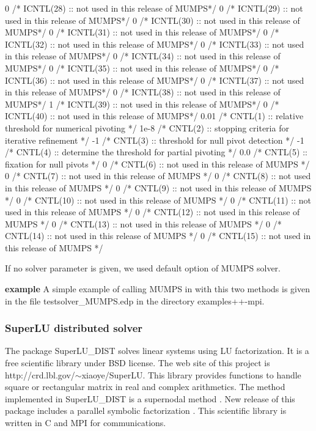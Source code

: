 \documentclass[a4paper,twoside,12pt]{book}
\begin{document}
 0         /* ICNTL(28) :: not used in this release of MUMPS*/
 0         /* ICNTL(29) :: not used in this release of MUMPS*/
 0         /* ICNTL(30) :: not used in this release of MUMPS*/
 0         /* ICNTL(31) :: not used in this release of MUMPS*/
 0         /* ICNTL(32) :: not used in this release of MUMPS*/
 0         /* ICNTL(33) :: not used in this release of MUMPS*/
 0         /* ICNTL(34) :: not used in this release of MUMPS*/
 0         /* ICNTL(35) :: not used in this release of MUMPS*/
 0         /* ICNTL(36) :: not used in this release of MUMPS*/
 0         /* ICNTL(37) :: not used in this release of MUMPS*/
 0         /* ICNTL(38) :: not used in this release of MUMPS*/
 1         /* ICNTL(39) :: not used in this release of MUMPS*/
 0         /* ICNTL(40) :: not used in this release of MUMPS*/
 0.01      /* CNTL(1) :: relative threshold for numerical pivoting */
 1e-8      /* CNTL(2) :: stopping criteria for iterative refinement */
 -1        /* CNTL(3) :: threshold for null pivot detection */
 -1        /* CNTL(4) :: determine the threshold for partial pivoting */
 0.0       /* CNTL(5) :: fixation for null pivots */
 0         /* CNTL(6) :: not used in this release of MUMPS */
 0         /* CNTL(7) :: not used in this release of MUMPS */
 0         /* CNTL(8) :: not used in this release of MUMPS */
 0         /* CNTL(9) :: not used in this release of MUMPS */
 0         /* CNTL(10) :: not used in this release of MUMPS */
 0         /* CNTL(11) :: not used in this release of MUMPS */
 0         /* CNTL(12) :: not used in this release of MUMPS */
 0         /* CNTL(13) :: not used in this release of MUMPS */
 0         /* CNTL(14) :: not used in this release of MUMPS */
 0         /* CNTL(15) :: not used in this release of MUMPS */	
\eFF

If no solver parameter is given, we used default option of MUMPS solver.

\begin{paragraph}{\bf{example}}
A simple example of calling MUMPS in \freefempp with this two methods is given in the file testsolver\_MUMPS.edp in the directory examples++-mpi.
\end{paragraph}

\subsubsection{SuperLU distributed solver}
\label{sectionsuperludist}

The package SuperLU\_DIST \cite{slu2,slu1}  solves linear systems using LU factorization. It is a free scientific library under BSD license. The web site of this project is
http://crd.lbl.gov/$\sim$xiaoye/SuperLU. This library provides functions to handle square or rectangular matrix in real and complex arithmetics. The method implemented
in SuperLU\_DIST is a supernodal method \cite{slu1}. New release of this package includes a parallel symbolic factorization \cite{slu2}. This scientific library is written
in C and MPI for communications.
\end{document}
